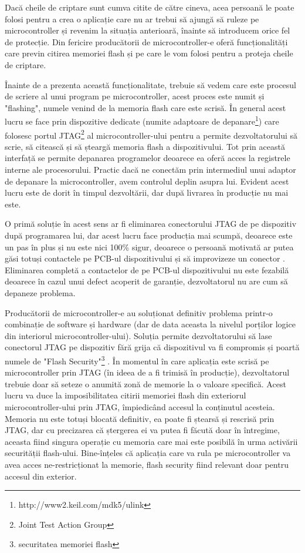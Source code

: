 \documentclass[12pt,a4paper,titlepage]{report}
\begin{document}
Dacă cheile de criptare sunt cumva citite de către cineva, acea persoană le poate folosi pentru a crea o aplicație care nu ar trebui să ajungă să ruleze pe microcontroller și revenim la situația anterioară, înainte să introducem orice fel de protecție. Din fericire producătorii de microcontroller-e oferă funcționalități care previn citirea memoriei flash și pe care le vom folosi pentru a proteja cheile de criptare.

Înainte de a prezenta această funcționalitate, trebuie să vedem care este procesul de scriere al unui program pe microcontroller, acest proces este numit și "flashing", numele venind de la memoria flash care este scrisă. În general acest lucru se face prin dispozitive dedicate (numite adaptoare de depanare\footnote{http://www2.keil.com/mdk5/ulink}) care folosesc portul JTAG\footnote{Joint Test Action Group} al microcontroller-ului pentru a permite dezvoltatorului să scrie, să citească și să șteargă memoria flash a dispozitivului. Tot prin această interfață se permite depanarea programelor deoarece ea oferă acces la registrele interne ale procesorului. Practic dacă ne conectăm prin intermediul unui adaptor de depanare la microcontroller, avem controlul deplin asupra lui. Evident acest lucru este de dorit în timpul dezvoltării, dar după livrarea în producție nu mai este.

O primă soluție în acest sens ar fi eliminarea conectorului JTAG de pe dispozitiv după programarea lui, dar acest lucru face producția mai scumpă, deoarece este un pas în plus și nu este nici 100\% sigur, deoarece o persoană motivată ar putea găsi totuși contactele pe PCB-ul dispozitivului și să improvizeze un conector \cite{hddHack}. Eliminarea completă a contactelor de pe PCB-ul dispozitivului nu este fezabilă deoarece în cazul unui defect acoperit de garanție, dezvoltatorul nu are cum să depaneze problema.

Producătorii de microcontroller-e au soluționat definitiv problema printr-o combinație de software și hardware (dar de data aceasta la nivelul porților logice din interiorul microcontroller-ului). Soluția permite dezvoltatorului să lase conectorul JTAG pe dispozitiv fără grija că dispozitivul va fi compromis și poartă numele de "Flash Security"\footnote{securitatea memoriei flash} \cite{nxpSecurity}. În momentul în care aplicația este scrisă pe microcontroller prin JTAG (în ideea de a fi trimisă în producție), dezvoltatorul trebuie doar să seteze o anumită zonă de memorie la o valoare specifică. Acest lucru va duce la imposibilitatea citirii memoriei flash din exteriorul microcontroller-ului prin JTAG, împiedicând accesul la conținutul acesteia. Memoria nu este totuși blocată definitiv, ea poate fi ștearsă și rescrisă prin JTAG, dar cu precizarea că ștergerea ei va putea fi făcută doar în întregime, aceasta fiind singura operație cu memoria care mai este posibilă în urma activării securității flash-ului. Bine-înțeles că aplicația care va rula pe microcontroller va avea acces ne-restricționat la memorie, flash security fiind relevant doar pentru accesul din exterior.
\end{document}
